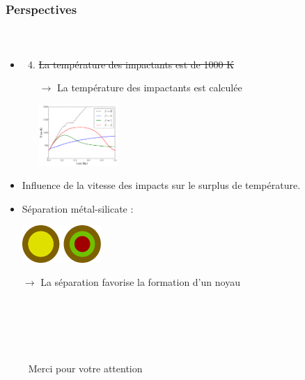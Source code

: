 \documentclass{beamer}
\begin{document}
\begin{frame}
	\frametitle{Perspectives}
	\framesubtitle{\ }
\begin{itemize}
\item 
\begin{enumerate}
\setcounter{enumi}{3}
\item \sout{La température des impactants est de 1000 K}

$\rightarrow$ La température des impactants est calculée




\center \includegraphics[width = 3cm]{figures/tempMoy_acretion.pdf}
\vspace{-0.45cm}

\center {}

\end{enumerate}
\item Influence de la vitesse des impacts sur le surplus de température.
\item Séparation métal-silicate :

\center \includegraphics[width = 3cm]{figures/phaseseparation.pdf}

$\rightarrow$ La séparation favorise la formation d'un noyau


\end{itemize}
\end{frame}

\begin{frame}
	\frametitle{\ }
	\framesubtitle{\ }

{\center $\qquad$ \Huge Merci pour votre attention}

\end{frame}
\end{document}
